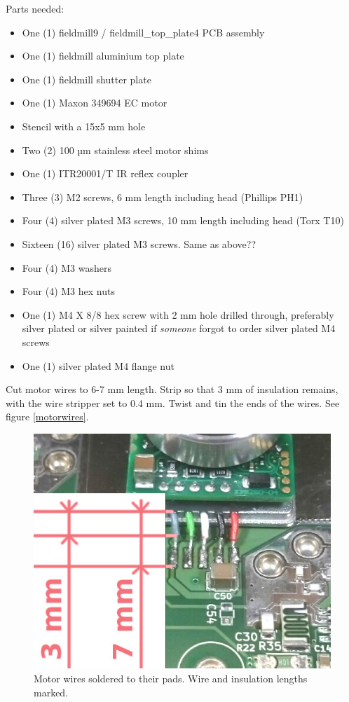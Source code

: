 \documentclass{article}
\begin{document}
Parts needed:

\begin{itemize}
\item One (1) fieldmill9 / fieldmill\_top\_plate4 PCB assembly
\item One (1) fieldmill aluminium top plate
\item One (1) fieldmill shutter plate
\item One (1) Maxon 349694 EC motor
\item Stencil with a 15x5 mm hole
\item Two (2) 100 µm stainless steel motor shims
\item One (1) ITR20001/T IR reflex coupler
\item Three (3) M2 screws, 6 mm length including head (Phillips PH1)
\item Four (4) silver plated M3 screws, 10 mm length including head (Torx T10)
\item Sixteen (16) silver plated M3 screws. Same as above??
\item Four (4) M3 washers
\item Four (4) M3 hex nuts
\item One (1) M4 X 8/8 hex screw with 2 mm hole drilled through, preferably silver plated or silver painted if {\it someone} forgot to order silver plated M4 screws
\item One (1) silver plated M4 flange nut
\end{itemize}

Cut motor wires to 6-7 mm length.
Strip so that 3 mm of insulation remains, with the wire stripper set to 0.4 mm.
Twist and tin the ends of the wires. See figure \vref{motorwires}.

\begin{figure}
\centering
\includegraphics[width=12cm]{3mm7mm}
\caption{Motor wires soldered to their pads. Wire and insulation lengths marked.}
\label{motorwires}
\end{figure}
\end{document}
